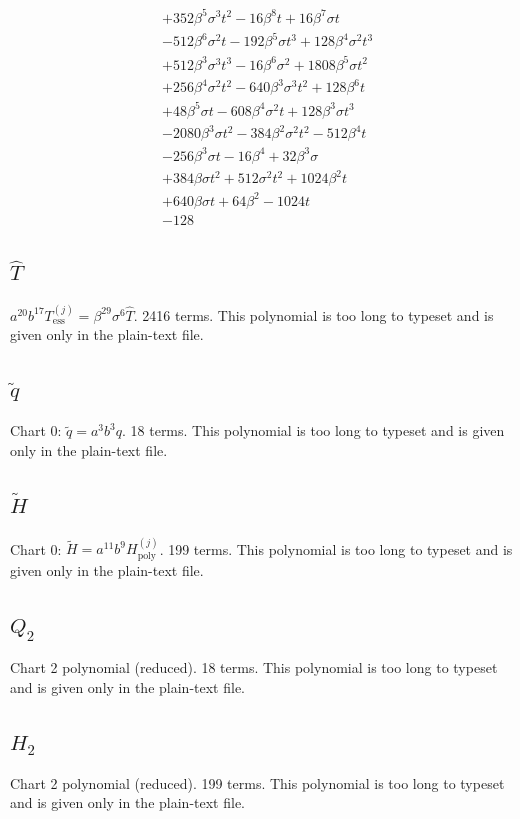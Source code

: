 {\begin{align*}
&+352\beta^{5} \sigma^{3} t^{2}-16\beta^{8} t+16\beta^{7} \sigma t\\
&-512\beta^{6} \sigma^{2} t-192\beta^{5} \sigma t^{3}+128\beta^{4} \sigma^{2} t^{3}\\
&+512\beta^{3} \sigma^{3} t^{3}-16\beta^{6} \sigma^{2}+1808\beta^{5} \sigma t^{2}\\
&+256\beta^{4} \sigma^{2} t^{2}-640\beta^{3} \sigma^{3} t^{2}+128\beta^{6} t\\
&+48\beta^{5} \sigma t-608\beta^{4} \sigma^{2} t+128\beta^{3} \sigma t^{3}\\
&-2080\beta^{3} \sigma t^{2}-384\beta^{2} \sigma^{2} t^{2}-512\beta^{4} t\\
&-256\beta^{3} \sigma t-16\beta^{4}+32\beta^{3} \sigma\\
&+384\beta \sigma t^{2}+512\sigma^{2} t^{2}+1024\beta^{2} t\\
&+640\beta \sigma t+64\beta^{2}-1024t\\
&-128
\end{align*}
}

\subsection*{$\hat T$}
$a^{20}b^{17}T^{(j)}_{\mathrm{ess}}=\beta^{29}\sigma^6\hat T$. 2416 terms.
This polynomial is too long to typeset and is given only in the plain-text file.

\subsection*{$\tilde q$}
Chart 0: $\tilde q=a^3b^3q$. 18 terms.
This polynomial is too long to typeset and is given only in the plain-text file.

\subsection*{$\tilde H$}
Chart 0: $\tilde H=a^{11}b^9H^{(j)}_{\mathrm{poly}}$. 199 terms.
This polynomial is too long to typeset and is given only in the plain-text file.

\subsection*{$Q_2$}
Chart 2 polynomial (reduced). 18 terms.
This polynomial is too long to typeset and is given only in the plain-text file.

\subsection*{$H_2$}
Chart 2 polynomial (reduced). 199 terms.
This polynomial is too long to typeset and is given only in the plain-text file.

